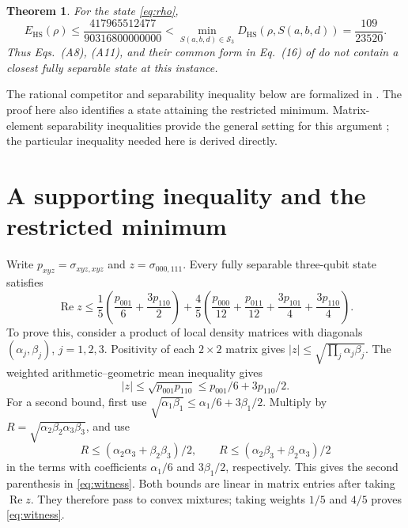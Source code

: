 \documentclass[11pt]{article}
\newtheorem{theorem}{Theorem}
\newcommand{\Sep}{\mathcal S}
\newcommand{\Rea}{\operatorname{Re}}
\newcommand{\E}{E_{\mathrm{HS}}}
\newcommand{\D}{D_{\mathrm{HS}}}
\begin{document}
\begin{theorem}\label{thm:main}
For the state \eqref{eq:rho},
\begin{equation}\label{eq:comparison}
 \E(\rho)\le\frac{417965512477}{90316800000000}
 <\min_{S(a,b,d)\in\Sep_3}\D(\rho,S(a,b,d))
 =\frac{109}{23520}.
\end{equation}
Thus Eqs.~(A8), (A11), and their common form in Eq.~(16) of \cite{CAW}
do not contain a closest fully separable state at this instance.
\end{theorem}
The rational competitor and separability inequality below are formalized
in \cite{Lean}. The proof here also identifies a state attaining the
restricted minimum. Matrix-element separability inequalities provide the
general setting for this argument \cite{GS,CHK}; the particular inequality
needed here is derived directly.

\section{A supporting inequality and the restricted minimum}
Write $p_{xyz}=\sigma_{xyz,xyz}$ and $z=\sigma_{000,111}$.
Every fully separable three-qubit state satisfies
\begin{equation}\label{eq:witness}
 \Rea z\le
 \frac15\left(\frac{p_{001}}6+\frac{3p_{110}}2\right)
 +\frac45\left(\frac{p_{000}}{12}+\frac{p_{011}}{12}
                +\frac{3p_{101}}4+\frac{3p_{110}}4\right).
\end{equation}
To prove this, consider a product of local density matrices with diagonals
$(\alpha_j,\beta_j)$, $j=1,2,3$. Positivity of each $2\times2$ matrix gives
$|z|\le\sqrt{\prod_j\alpha_j\beta_j}$. The weighted arithmetic--geometric
mean inequality gives
\[
 |z|\le\sqrt{p_{001}p_{110}}
       \le p_{001}/6+3p_{110}/2.
\]
For a second bound, first use
$\sqrt{\alpha_1\beta_1}\le\alpha_1/6+3\beta_1/2$.
Multiply by $R=\sqrt{\alpha_2\beta_2\alpha_3\beta_3}$, and use
\[
 R\le(\alpha_2\alpha_3+\beta_2\beta_3)/2,
 \qquad R\le(\alpha_2\beta_3+\beta_2\alpha_3)/2
\]
in the terms with coefficients $\alpha_1/6$ and $3\beta_1/2$, respectively.
This gives the second parenthesis in \eqref{eq:witness}.
Both bounds are linear in matrix entries after taking $\Rea z$.
They therefore pass to convex mixtures; taking weights $1/5$ and $4/5$
proves \eqref{eq:witness}.
\end{document}
